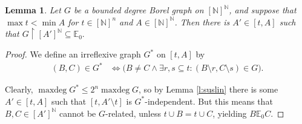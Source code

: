 \documentclass[10pt,a4paper]{amsart}
\newtheorem{lemma}{Lemma}
\newcommand{\N}{\mathbb{N}}
\DeclareMathOperator{\maxdeg}{maxdeg}
\renewcommand{\restriction}[2]{#1 \upharpoonright #2}
\begin{document}
	\begin{lemma}
		\label{l:indep2} Let $G$ be a bounded degree Borel graph on $[\N]^\N$, and suppose that $\max t<\min A$ for $t \in [\N]^n$ and $A\in [\N]^\N$. Then there is $A' \in [t,A]$ such that $\restriction{G}{[A']^\N} \subseteq \mathbb{E}_0.$
	\end{lemma}

	\begin{proof}
		We define an irreflexive graph $G^*$ on $[t,A]$ by 
		\begin{align*}
		(B,C)\in G^*&\iff \big(B\ne C \land \exists r,s \subseteq t: (B \setminus r,C \setminus s)\in G\big).
		\end{align*}
		
		Clearly, $\maxdeg G^* \leq 2^{n} \maxdeg G$, so by Lemma \ref{l:suslin} there is some $A' \in[t,A]$ such that $[t,A'\setminus t]$ is $G^*$-independent. But this means that $B,C \in [A']^\N$ cannot be $G$-related, unless $t \cup B=t \cup C$, yielding $B \mathbb{E}_0 C$.
	\end{proof}
\end{document}
